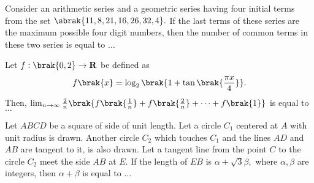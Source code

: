 \iffalse
\title{2021}
\author{EE24BTECH11008}
\section{integer}
\fi
       \item Consider an arithmetic series and a geometric series having four initial terms from the set $\sbrak{11,8,21,16,26,32,4}.$ If the last terms of these series are the maximum possible four digit numbers, then the number of common terms in these two series is equal to $\dots$
	       \hfill{}\\
    \item Let $f :\brak{0,2} \to \textbf{R}$ be defined as $$f\brak{x}=\log_2\brak{1+\tan\brak{\frac{\pi x}{4}}}.$$ Then, $\lim_{n \to \infty}\frac{2}{n}\brak{f\brak{\frac{1}{n}}+f\brak{\frac{2}{n}}+ \dots +f\brak{1}}$ is equal to $\dots$
	   \hfill{} \\
    \item Let $ABCD$ be a square of side of unit length. Let a circle $C_{1}$ centered at $A$ with unit radius is drawn. Another circle $C_{2}$ which touches $C_{1}$ and the lines $AD$ and $AB$ are tangent to it, is also drawn. Let a tangent line from the point $C$ to the circle $C_{2}$ meet the side $AB$ at $E$. If the length of $EB$ is $\alpha + \sqrt{3}\beta ,$ where $\alpha,\beta$ are integers, then $\alpha +\beta$ is equal to $\dots$
	    \hfill{}\\

